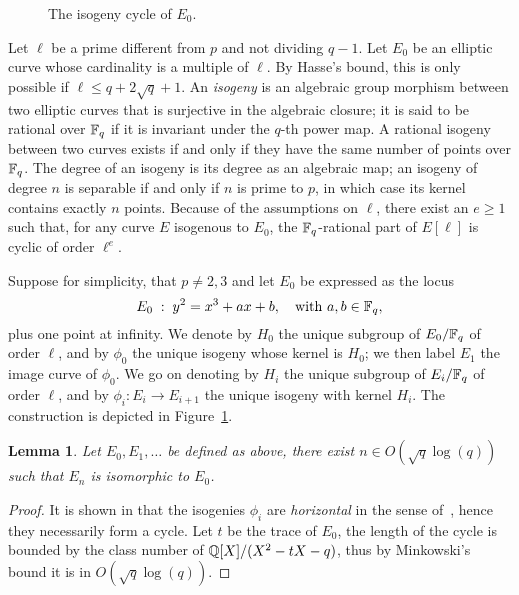 \documentclass{sig-alternate}
\newtheorem{lemma}[definition]{Lemma}
\begin{document}
\begin{figure}
  \centering
  \caption{The isogeny cycle of $E_0$.}
  \label{fig:volcano}
\end{figure}

Let $\ell$ be a prime different from $p$ and not dividing $q-1$. Let
$E_0$ be an elliptic curve whose cardinality is a multiple of
$\ell$. By Hasse's bound, this is only possible if $\ell\le q +
2\sqrt{q} + 1$.  An \emph{isogeny} is an algebraic group morphism
between two elliptic curves that is surjective in the algebraic
closure; it is said to be rational over $\mathbb{F}_q$ if it is invariant
under the $q$-th power map. A rational isogeny between two curves
exists if and only if they have the same number of points over
$\mathbb{F}_q$. The degree of an isogeny is its degree as an algebraic map; an
isogeny of degree $n$ is separable if and only if $n$ is prime to $p$,
in which case its kernel contains exactly $n$ points.  Because of the
assumptions on $\ell$, there exist an $e\ge1$ such that, for any curve
$E$ isogenous to $E_0$, the $\mathbb{F}_q$-rational part of $E[\ell]$ is
cyclic of order $\ell^e$.

Suppose for simplicity, that $p\ne2,3$ and let $E_0$ be expressed as
the locus
\begin{equation}
  E_0 \;:\; y^2 = x^3 + ax + b,
  \quad\text{with $a,b\in\mathbb{F}_q$},
\end{equation}
plus one point at infinity.  We denote by $H_0$ the unique subgroup of
$E_0/\mathbb{F}_q$ of order $\ell$, and by $\phi_0$ the unique isogeny whose
kernel is $H_0$; we then label $E_1$ the image curve of $\phi_0$. We
go on denoting by $H_i$ the unique subgroup of $E_i/\mathbb{F}_q$ of order
$\ell$, and by $\phi_i:E_i\to E_{i+1}$ the unique isogeny with kernel
$H_i$. The construction is depicted in Figure~\ref{fig:volcano}.

\begin{lemma}
  \label{th:class-number}
  Let $E_0,E_1,\dots$ be defined as above, there exist $n\in
  O(\sqrt{q}\log (q))$ such that $E_n$ is isomorphic to $E_0$.
\end{lemma}
\begin{proof}
  It is shown in \cite[Section~4]{couveignes+lercier11} that the
  isogenies $\phi_i$ are \emph{horizontal} in the sense
  of~\cite{kohel}, hence they necessarily form a cycle. Let $t$ be the
  trace of $E_0$, the length of the cycle is bounded by the class
  number of $\mathbb{Q}[X]/(X^2-tX-q)$, thus by Minkowski's bound it is in
  $O(\sqrt{q}\log (q))$.
\end{proof}
\end{document}
